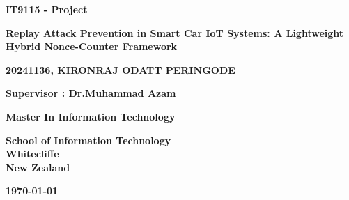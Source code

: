 \documentclass[a4paper,man,12pt]{article}
\begin{document}

\begin{titlepage}
    \begin{center} %
        
        \vspace*{2cm}
        
        \textbf{\LARGE IT9115 - Project}
        
        \vspace{1.5cm}
        
        \textbf{\Large Replay Attack Prevention in Smart Car IoT Systems:
          A Lightweight Hybrid Nonce-Counter Framework}
        
        \vspace{2cm}
        
        \textbf{20241136, KIRONRAJ ODATT PERINGODE}

        \vspace{3cm}

        \textbf{Supervisor : Dr.Muhammad Azam }
        
        \vfill
        
        \textbf{Master In Information Technology}
        
        \vfill
        
        \textbf{School of Information Technology}\\
        \textbf{Whitecliffe}\\
        \textbf{New Zealand}
        
        \vspace{1cm}
        
        \textbf{\today}
        
    \end{center} %
\end{titlepage} %
\end{document}
